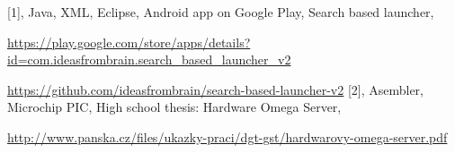 \documentclass[11pt,a4paper,sans]{moderncv} %
\begin{document}
\begin{thebibliography}{99}



         [1], Java, XML, Eclipse, Android app on Google Play, Search based launcher, \par
                 \url{https://play.google.com/store/apps/details?id=com.ideasfrombrain.search_based_launcher_v2}\par
		 \url{https://github.com/ideasfrombrain/search-based-launcher-v2}
         [2], Asembler, Microchip PIC, High school thesis: Hardware Omega Server, \par
                \url{http://www.panska.cz/files/ukazky-praci/dgt-gst/hardwarovy-omega-server.pdf}

\end{thebibliography}
\end{document}
